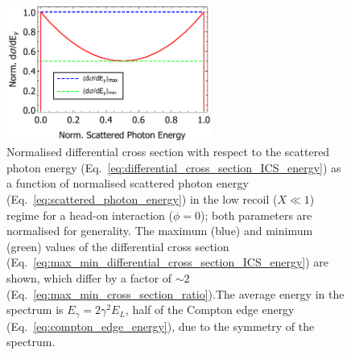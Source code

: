 \documentclass[../main.tex]{subfiles}
\begin{document}
\begin{figure}[!h]
\centering
\includegraphics[width=0.6\textwidth]{Figures/Photon_Production_by_Inverse_Compton_Scattering/Cross_Section_Scattered_Photon_Energy.pdf}
\caption{Normalised differential cross section with respect to the scattered photon energy (Eq.~\ref{eq:differential_cross_section_ICS_energy}) as a function of normalised scattered photon energy (Eq.~\ref{eq:scattered_photon_energy}) in the low recoil ($X \ll 1$) regime for a head-on interaction ($\phi=0$); both parameters are normalised for generality. The maximum (blue) and minimum (green) values of the differential cross section (Eq.~\ref{eq:max_min_differential_cross_section_ICS_energy}) are shown, which differ by a factor of $\sim2$ (Eq.~\ref{eq:max_min_cross_section_ratio}).The average energy in the spectrum is $E_{\gamma}=2\gamma^{2}E_{L}$, half of the Compton edge energy (Eq.~\ref{eq:compton_edge_energy}), due to the symmetry of the spectrum.}
\label{fig:cross_section_scattered_photon_energy}
\end{figure}
\end{document}
